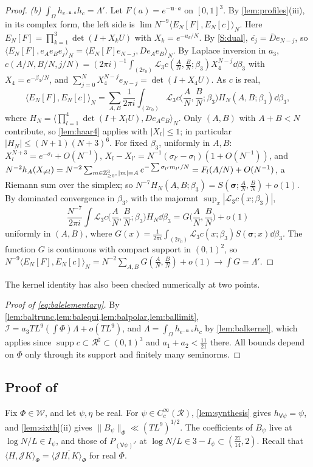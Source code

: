 \documentclass[11pt,colorlinks]{charlie}
\newcommand{\Om}{\Omega}
\newcommand{\ip}[2]{\langle #1,#2\rangle}
\begin{document}
\begin{proof}
\emph{(b) $\int_\Om h_{e^{-\boldsymbol u\cdot a}}h_c=\Lambda'$.} Let $F(a)=e^{-\boldsymbol u\cdot a}$ on $[0,1]^3$. By \cref{lem:profiles}(iii), in its complex form, the left side is $\lim N^{-9}\ip{E_N[F]}{E_N[c]}_N$. Here $E_N[F]=\prod_{k=1}^3\det(I+X_kU)$ with $X_k=e^{-u_k/N}$. By \ref{S:dual}, $\overline{e_j}=\overline De_{N-j}$, so $\ip{E_N[F]}{e_Ae_Be_j}_N=\ip{E_N[F]e_{N-j}}{De_Ae_B}_N$. By Laplace inversion in $a_3$, $c(A/N,B/N,j/N)=(2\pi i)^{-1}\int_{(2r_0)}\mathcal L_3c(\frac AN,\frac BN;\beta_3)X_4^{N-j}\dd\beta_3$ with $X_4=e^{-\beta_3/N}$, and $\sum_{j=0}^NX_4^{N-j}e_{N-j}=\det(I+X_4U)$. As $c$ is real,
\[
 \ip{E_N[F]}{E_N[c]}_N=\sum_{A,B}\frac1{2\pi i}\int_{(2r_0)}\mathcal L_3c\Big(\frac AN,\frac BN;\beta_3\Big)H_N(A,B;\beta_3)\dd\beta_3,
\]
where $H_N=\big\langle\prod_{l=1}^4\det(I+X_lU),De_Ae_B\big\rangle_N$.
Only $(A,B)$ with $A+B<N$ contribute, so \cref{lem:haar4} applies with $|X_l|\le1$; in particular $|H_N|\le(N+1)(N+3)^6$. For fixed $\beta_3$, uniformly in $A,B$: $X_l^{N+3}=e^{-\sigma_l}+O(N^{-1})$, $X_l-X_{l'}=N^{-1}(\sigma_{l'}-\sigma_l)(1+O(N^{-1}))$, and $N^{-2}h_A(X_{\ne l})=N^{-2}\sum_{m\in\mathbb{Z}_{\ge0}^3,\,|m|=A}e^{-\sum\sigma_{l'}m_{l'}/N}=F_l(A/N)+O(N^{-1})$, a Riemann sum over the simplex; so $N^{-7}H_N(A,B;\beta_3)=S(\boldsymbol\sigma;\frac AN,\frac BN)+o(1)$. By dominated convergence in $\beta_3$, with the majorant $\sup_x|\mathcal L_3c(x;\beta_3)|$,
\[
 \frac{N^{-7}}{2\pi i}\int\mathcal L_3c\Big(\frac AN,\frac BN;\beta_3\Big)H_N\dd\beta_3=G\Big(\frac AN,\frac BN\Big)+o(1)
\]
uniformly in $(A,B)$, where $G(x)=\frac1{2\pi i}\int_{(2r_0)}\mathcal L_3c(x;\beta_3)S(\boldsymbol\sigma;x)\dd\beta_3$. The function $G$ is continuous with compact support in $(0,1)^2$, so $N^{-9}\ip{E_N[F]}{E_N[c]}_N=N^{-2}\sum_{A,B}G(\frac AN,\frac BN)+o(1)\to\int G=\Lambda'$.
\end{proof}
\noindent The kernel identity has also been checked numerically at two points.

\begin{proof}[Proof of \eqref{eq:balelementary}]
By \cref{lem:baltrunc,lem:balequi,lem:balpolar,lem:ballimit}, $\mathcal I=a_3TL^9(\int\Phi)\Lambda+o(TL^9)$, and $\Lambda=\int_\Om h_{e^{-\boldsymbol u\cdot a}}h_c$ by \cref{lem:balkernel}, which applies since $\operatorname{supp}c\subset\mathcal R^\sharp\subset(0,1)^3$ and $a_1+a_2<\frac{11}{21}$ there. All bounds depend on $\Phi$ only through its support and finitely many seminorms.
\end{proof}

\subsection{Proof of }
Fix $\Phi\in\mathcal W$, and let $\psi,\eta$ be real. For $\psi\in C_c^\infty(\mathcal R)$, \cref{lem:synthesis} gives $h_{\mathsf V\psi}=\psi$, and \cref{lem:sixth}(ii) gives $\|B_\psi\|_\Phi\ll(TL^9)^{1/2}$. The coefficients of $B_\psi$ live at $\log N/L\in I_\psi$, and those of $P_{(\mathsf V\psi)^J}$ at $\log N/L\in3-I_\psi\subset(\frac{27}{14},2)$. Recall that $\ip H{\mathcal JK}_\Phi=\overline{\ip{\mathcal JH}K_\Phi}$ for real $\Phi$.
\end{document}
